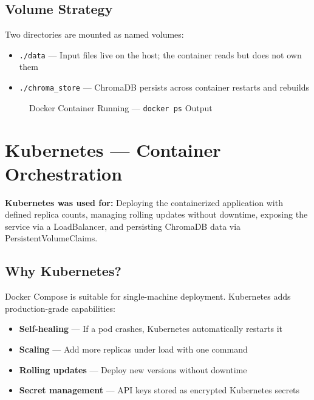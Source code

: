\documentclass[12pt,a4paper]{report}
\begin{document}
\subsection{Volume Strategy}

Two directories are mounted as named volumes:
\begin{itemize}[leftmargin=2cm]
    \item \texttt{./data} --- Input files live on the host; the container reads but does not own them
    \item \texttt{./chroma\_store} --- ChromaDB persists across container restarts and rebuilds
\end{itemize}

\begin{figure}[H]
    \centering
    \caption{Docker Container Running --- \texttt{docker ps} Output}
    \label{fig:docker_running}
\end{figure}

\section{Kubernetes --- Container Orchestration}

\begin{mdframed}[style=toolbox]
\textbf{Kubernetes was used for:} Deploying the containerized application with defined replica counts, managing rolling updates without downtime, exposing the service via a LoadBalancer, and persisting ChromaDB data via PersistentVolumeClaims.
\end{mdframed}

\subsection{Why Kubernetes?}

Docker Compose is suitable for single-machine deployment. Kubernetes adds production-grade capabilities:
\begin{itemize}[leftmargin=2cm]
    \item \textbf{Self-healing} --- If a pod crashes, Kubernetes automatically restarts it
    \item \textbf{Scaling} --- Add more replicas under load with one command
    \item \textbf{Rolling updates} --- Deploy new versions without downtime
    \item \textbf{Secret management} --- API keys stored as encrypted Kubernetes secrets
\end{itemize}
\end{document}
